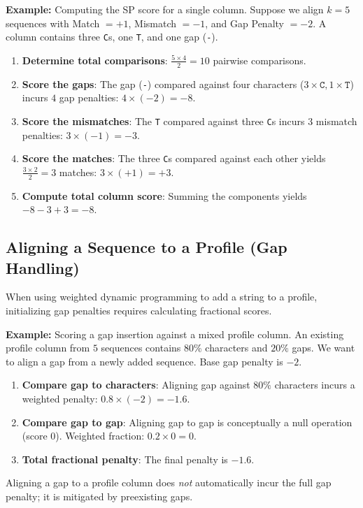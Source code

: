 \textbf{Example:} Computing the SP score for a single column.
Suppose we align $k=5$ sequences with Match $= +1$, Mismatch $= -1$, and Gap Penalty $= -2$. A column contains three \texttt{C}s, one \texttt{T}, and one gap (\texttt{-}).
\begin{enumerate}
  \item \textbf{Determine total comparisons}: $\frac{5 \times 4}{2} = 10$ pairwise comparisons.
  \item \textbf{Score the gaps}: The gap (\texttt{-}) compared against four characters ($3 \times \texttt{C}, 1 \times \texttt{T}$) incurs $4$ gap penalties: $4 \times (-2) = -8$.
  \item \textbf{Score the mismatches}: The \texttt{T} compared against three \texttt{C}s incurs $3$ mismatch penalties: $3 \times (-1) = -3$.
  \item \textbf{Score the matches}: The three \texttt{C}s compared against each other yields $\frac{3 \times 2}{2} = 3$ matches: $3 \times (+1) = +3$.
  \item \textbf{Compute total column score}: Summing the components yields $-8 - 3 + 3 = -8$.
\end{enumerate}

\subsection{Aligning a Sequence to a Profile (Gap Handling)}
When using weighted dynamic programming to add a string to a profile, initializing gap penalties requires calculating fractional scores.

\textbf{Example:} Scoring a gap insertion against a mixed profile column.
An existing profile column from $5$ sequences contains $80\%$ characters and $20\%$ gaps. We want to align a gap from a newly added sequence. Base gap penalty is $-2$.
\begin{enumerate}
  \item \textbf{Compare gap to characters}: Aligning gap against $80\%$ characters incurs a weighted penalty: $0.8 \times (-2) = -1.6$.
  \item \textbf{Compare gap to gap}: Aligning gap to gap is conceptually a null operation (score $0$). Weighted fraction: $0.2 \times 0 = 0$.
  \item \textbf{Total fractional penalty}: The final penalty is $-1.6$.
\end{enumerate}
Aligning a gap to a profile column does \textit{not} automatically incur the full gap penalty; it is mitigated by preexisting gaps.

